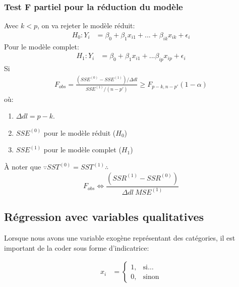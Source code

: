 \documentclass[10pt, french]{article}
\begin{document}
\begin{multicols*}{3}
\subsubsection*{Test F partiel pour la réduction du modèle}
Avec $k < p$, on va rejeter le modèle réduit:
\begin{align*}
H_0 : Y_i &= \beta_0 + \beta_1 x_{i1} + ... + \beta_{ik} x_{ik} + \epsilon_i 
\end{align*}
Pour le modèle complet:
\begin{align*}
H_1 : Y_i &= \beta_0 + \beta_1 x_{i1} + ... \beta_{ip} x_{ip} + \epsilon_i 
\end{align*}
Si
\begin{align*}
F_{obs} = \frac{(SSE^{(0)} - SSE^{(1)}) / \Delta dl}{SSE^{(1)} / (n-p')} \geq F_{p-k, n-p'}(1- \alpha)
\end{align*}
où:
\begin{enumerate}
	\item[] $\Delta dl = p - k$.
	\item[] $SSE^{(0)}$ pour le modèle réduit ($H_0$)
	\item[] $SSE^{(1)}$ pour le modèle complet ($H_1$)
\end{enumerate}

À noter que $\because SST^{(0)} = SST^{(1)} \therefore$
\[
	F_{obs} \Leftrightarrow \frac{(SSR^{(1)} - SSR^{(0)})}{\Delta dl \  MSE^{(1)}}
\]

\subsection*{Régression avec variables qualitatives}

Lorsque nous avons une variable exogène représentant des catégories, il est important de la coder sous forme d'indicatrice:

\begin{align*}
	x_{i} &= \left\{
	\begin{matrix}
		1, & \text{si}\dots \\
		0, & \text{sinon}
	\end{matrix}
	\right.
\end{align*}


\end{multicols*}
\end{document}
